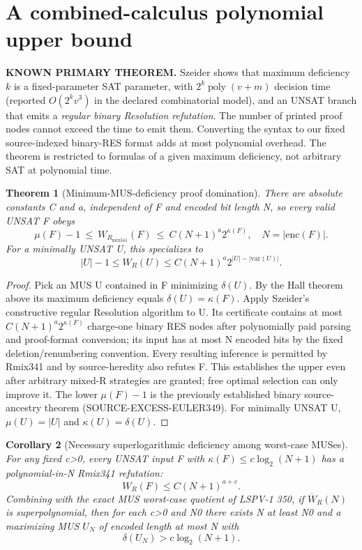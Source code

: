 \documentclass[11pt]{article}
\newtheorem{theorem}{Theorem}
\newtheorem{corollary}[theorem]{Corollary}
\begin{document}
\section*{A combined-calculus polynomial upper bound}
\noindent\textbf{KNOWN PRIMARY THEOREM.} Szeider \cite{Szeider2004} shows that maximum deficiency $k$ is a fixed-parameter SAT parameter, with $2^k\operatorname{poly}(v+m)$ decision time (reported $O(2^k v^3)$ in the declared combinatorial model), and an UNSAT branch that emits a \emph{regular binary Resolution refutation}. The number of printed proof nodes cannot exceed the time to emit them. Converting the syntax to our fixed source-indexed binary-RES format adds at most polynomial overhead. The theorem is restricted to formulas of a given maximum deficiency, not arbitrary SAT at polynomial time.
\begin{theorem}[Minimum-MUS-deficiency proof domination]
There are absolute constants C and a, independent of F and encoded bit length N, so every valid UNSAT F obeys
\[
\boxed{\mu(F)-1\ \le\ W_{R_{\mathrm{mix341}}}(F)\ \le\ C(N+1)^a2^{\kappa(F)},\quad N=|\mathrm{enc}(F)|.}
\]
For a minimally UNSAT U, this specializes to
\[
\boxed{|U|-1\le W_R(U)\le C(N+1)^a2^{|U|-|\mathrm{var}(U)|}.}
\]
\end{theorem}
\begin{proof}
Pick an MUS U contained in F minimizing $\delta(U)$. By the Hall theorem above its maximum deficiency equals $\delta(U)=\kappa(F)$. Apply Szeider's constructive regular Resolution algorithm to U. Its certificate contains at most $C(N+1)^a2^{\kappa(F)}$ charge-one binary RES nodes after polynomially paid parsing and proof-format conversion; its input has at most N encoded bits by the fixed deletion/renumbering convention. Every resulting inference is permitted by Rmix341 and by source-heredity also refutes F. This establishes the upper even after arbitrary mixed-R strategies are granted; free optimal selection can only improve it. The lower $\mu(F)-1$ is the previously established binary source-ancestry theorem (SOURCE-EXCESS-EULER349). For minimally UNSAT U, $\mu(U)=|U|$ and $\kappa(U)=\delta(U)$.
\end{proof}
\begin{corollary}[Necessary superlogarithmic deficiency among worst-case MUSes]
For any fixed c>0, every UNSAT input F with $\kappa(F)\le c\log_2(N+1)$ has a polynomial-in-N Rmix341 refutation:
\[
W_R(F)\le C(N+1)^{a+c}.
\]
Combining with the exact MUS worst-case quotient of LSPV-1 350, if $\overline W_R(N)$ is superpolynomial, then for each c>0 and N0 there exists N at least N0 and a maximizing MUS $U_N$ of encoded length at most N with
\[
\boxed{\delta(U_N)>c\log_2(N+1).}
\]
\end{corollary}
\end{document}
